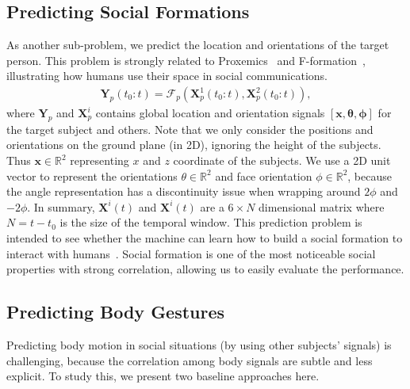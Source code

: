 \subsection{Predicting Social Formations}
As another sub-problem, we predict the location and orientations of the target person. This problem is strongly related to Proxemics~\cite{Hall66} and F-formation~\cite{kendon90}, illustrating how humans use their space in social communications.
\begin{gather}	
 \mathbf{Y}_p (t_0:t) = \mathcal{F}_p \left( \mathbf{X}_p^1(t_0:t), \mathbf{X}_p^2(t_0:t) \right),
 \label{eq:pred_formation}
\end{gather}
where $\mathbf{Y}_p$ and $\mathbf{X}_p^i$ contains global location and orientation signals $[\mathbf{x}, \boldsymbol{\theta}, \boldsymbol{\phi} ]$ for the target subject and others.
Note that we only consider the positions and orientations on the ground plane (in 2D), ignoring the height of the subjects. Thus $\mathbf{x} \in \mathbb{R}^2 $ representing $x$ and $z$ coordinate of the subjects. We use a 2D unit vector to represent the orientations $\theta \in \mathbb {R}^2$ and face orientation $\phi \in \mathbb{R}^2$, because the angle representation has a discontinuity issue when wrapping around $2\phi$ and $-2\phi$. In summary, $\mathbf{X}^i(t)$ and $\mathbf{X}^i(t)$ are a $6 \times N$ dimensional matrix where $N = t- t_0$ is the size of the temporal window. This prediction problem is intended to see whether the machine can learn how to build a social formation to interact with humans~\cite{vazquez2017towards}. Social formation is one of the most noticeable social properties with strong correlation, allowing us to easily evaluate the performance.



\subsection{Predicting Body Gestures}
Predicting body motion in social situations (by using other subjects' signals) is challenging, because the correlation among body signals are subtle and less explicit. To study this, we present two baseline approaches here. 

